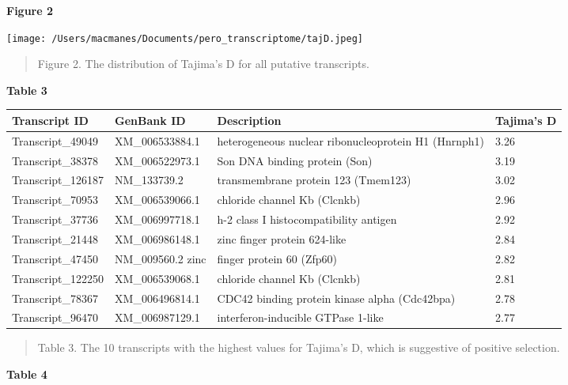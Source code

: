 \documentclass[11pt]{article}
\begin{document}
\textbf{\hypertarget{Figure 2}{Figure 2}} \\
\centerline{\texttt{[image: /Users/macmanes/Documents/pero\_transcriptome/tajD.jpeg]}}
\begin{quote}
\small{Figure 2. The distribution of Tajima's D for all putative transcripts.}
\end{quote}  
\vspace{10mm}
\textbf{\hypertarget{Table 3}{Table 3}} \\
\begin{center}
\begin{adjustwidth}{-.75in}{-.75in}%
\begin{tabular}{ l l l l }
\textbf{Transcript ID} & \textbf{GenBank ID} & \textbf{Description} & \textbf{Tajima's D}\\
\hline
Transcript\_49049 & XM\_006533884.1 & heterogeneous nuclear ribonucleoprotein H1 (Hnrnph1) & 3.26\\
Transcript\_38378 & XM\_006522973.1 & Son DNA binding protein (Son) & 3.19\\
Transcript\_126187 & NM\_133739.2 & transmembrane protein 123 (Tmem123) & 3.02\\
Transcript\_70953 & XM\_006539066.1 & chloride channel Kb (Clcnkb) & 2.96 \\
Transcript\_37736 & XM\_006997718.1 & h-2 class I histocompatibility antigen & 2.92 \\
Transcript\_21448 & XM\_006986148.1 & zinc finger protein 624-like & 2.84\\
Transcript\_47450 & NM\_009560.2 zinc & finger protein 60 (Zfp60) & 2.82\\
Transcript\_122250 & XM\_006539068.1 & chloride channel Kb (Clcnkb) & 2.81\\
Transcript\_78367 & XM\_006496814.1 & CDC42 binding protein kinase alpha (Cdc42bpa) & 2.78 \\
Transcript\_96470 & XM\_006987129.1 & interferon-inducible GTPase 1-like & 2.77 \\
 \end{tabular}
\begin{quote}
\small{Table 3. The 10 transcripts with the highest values for Tajima's D, which is suggestive of positive selection.}
\end{quote}  
\end{adjustwidth}
\end{center}
\vspace{10mm}
\textbf{\hypertarget{Table 4}{Table 4}} \\
\end{document}
